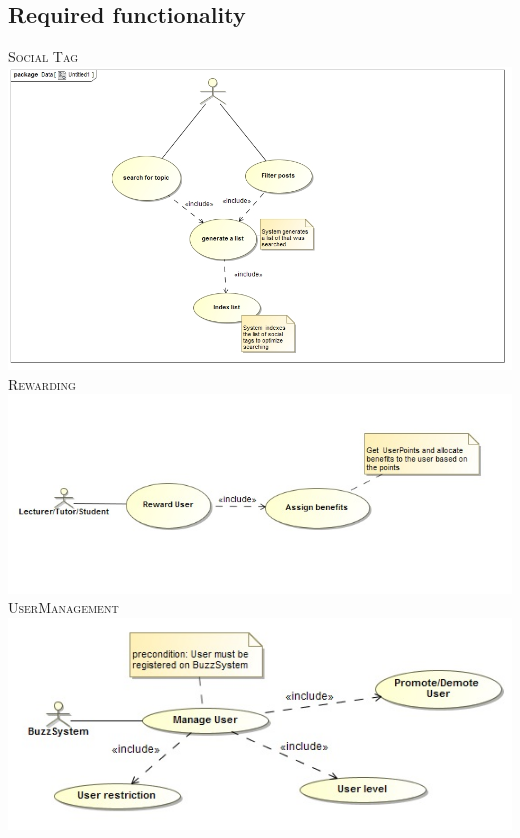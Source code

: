 \documentclass[a4paper,12pt]{report}
\begin{document}
\newpage
\subsection{Required functionality}
\textsc{Social Tag}
\emph{}\\
\includegraphics[width=1\textwidth]{./socialtag.jpg}\\[0.4cm]

\textsc{Rewarding}
\emph{}\\
\includegraphics[width=1\textwidth]{./Use_Case_Diagram_RewardUser.jpg}\\[0.4cm] 

\newpage
\textsc{UserManagement}
\emph{}\\
\includegraphics[width=1\textwidth]{./Activity_Diagram_UserManagement.jpg}\\[0.4cm]
\end{document}
